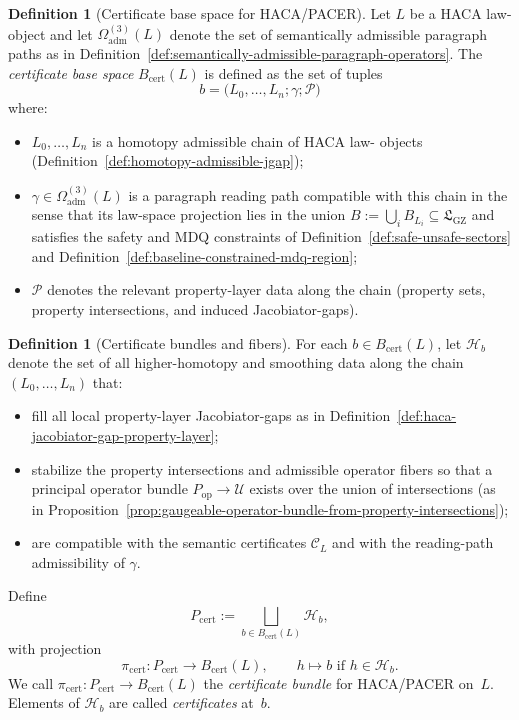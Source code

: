 \documentclass[11pt]{book}
\theoremstyle{plain}
\theoremstyle{definition}
\newtheorem{definition}[theorem]{Definition}
\theoremstyle{remark}
\newcommand{\GZLS}{\ensuremath{\mathfrak{L}_{\mathrm{GZ}}}}       \newcommand{\GZLT}{\ensuremath{M_{!w}}}                           \newcommand{\GZLOC}{\ensuremath{A_M}}                             \newcommand{\GZLC}{\ensuremath{\omega_{\mathrm{law}}}}            \newcommand{\GZLCurv}{\ensuremath{\mathcal{F}_{\mathrm{law}}}}
\begin{document}
\begin{definition}[Certificate base space for HACA/PACER]
\label{def:certificate-base-space}
Let $L$ be a HACA law-object and let $\Omega^{(3)}_{\mathrm{adm}}(L)$
denote the set of semantically admissible paragraph paths as in
Definition~\ref{def:semantically-admissible-paragraph-operators}. The
\emph{certificate base space} $B_{\mathrm{cert}}(L)$ is defined as the
set of tuples
\[
  b = \bigl(L_0,\dots,L_n; \gamma; \mathcal{P}\bigr)
\]
where:
\begin{itemize}
  \item $L_0,\dots,L_n$ is a homotopy admissible chain of HACA law-
        objects (Definition~\ref{def:homotopy-admissible-jgap});
  \item $\gamma\in\Omega^{(3)}_{\mathrm{adm}}(L)$ is a paragraph
        reading path compatible with this chain in the sense that its
        law-space projection lies in the union
        $B:=\bigcup_i B_{L_i}\subseteq\GZLS$ and satisfies the
        safety and MDQ constraints of
        Definition~\ref{def:safe-unsafe-sectors} and
        Definition~\ref{def:baseline-constrained-mdq-region};
  \item $\mathcal{P}$ denotes the relevant property-layer data along
        the chain (property sets, property intersections, and induced
        Jacobiator-gaps).
\end{itemize}
\end{definition}

\begin{definition}[Certificate bundles and fibers]
\label{def:certificate-bundle}
For each $b\in B_{\mathrm{cert}}(L)$, let $\mathcal{H}_b$ denote the
set of all higher-homotopy and smoothing data along the chain
$(L_0,\dots,L_n)$ that:
\begin{itemize}
  \item fill all local property-layer Jacobiator-gaps as in
        Definition~\ref{def:haca-jacobiator-gap-property-layer};
  \item stabilize the property intersections and admissible operator
        fibers so that a principal operator bundle
        $P_{\mathrm{op}}\to\mathcal{U}$ exists over the union of
        intersections (as in
        Proposition~\ref{prop:gaugeable-operator-bundle-from-property-intersections});
  \item are compatible with the semantic certificates $\mathcal{C}_L$
        and with the reading-path admissibility of $\gamma$.
\end{itemize}
Define
\[
  P_{\mathrm{cert}}
  :=
  \bigsqcup_{b\in B_{\mathrm{cert}}(L)} \mathcal{H}_b,
\]
with projection
\[
  \pi_{\mathrm{cert}} : P_{\mathrm{cert}}\longrightarrow B_{\mathrm{cert}}(L),
  \qquad
  h\mapsto b \text{ if }h\in\mathcal{H}_b.
\]
We call $\pi_{\mathrm{cert}}:P_{\mathrm{cert}}\to B_{\mathrm{cert}}(L)$
the \emph{certificate bundle} for HACA/PACER on~$L$. Elements of
$\mathcal{H}_b$ are called \emph{certificates} at~$b$.
\end{definition}
\end{document}

